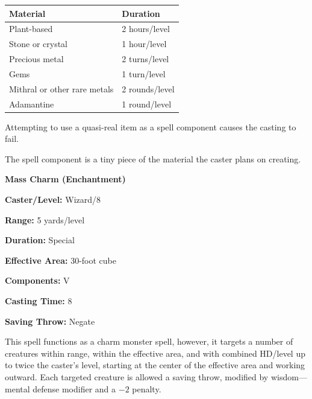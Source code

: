 \begin{multicols}{2}
\noindent
\begin{tabular}{|p{}|p{}|}
\hline
Material	& Duration \\
\hline\hline
\rowcolor[gray]{.9}Plant-based	& 2 hours/level \\
Stone or crystal	& 1 hour/level \\
\rowcolor[gray]{.9}Precious metal	& 2 turns/level \\
Gems	& 1 turn/level \\
\rowcolor[gray]{.9}Mithral or other rare metals	& 2 rounds/level \\
Adamantine	& 1 round/level \\
\hline
\end{tabular}

Attempting to use a quasi-real item as a spell component causes the casting to fail.  

The spell component is a tiny piece of the material the caster plans on creating.

\vspace{1em}

\noindent
\begin{minipage}{\columnwidth}

\noindent \textbf{Mass Charm (Enchantment)}

\noindent \textbf{Caster/Level:} Wizard/8

\noindent \textbf{Range:} 5 yards/level

\noindent \textbf{Duration:} Special

\noindent \textbf{Effective Area:} 30-foot cube

\noindent \textbf{Components:} V

\noindent \textbf{Casting Time:} 8

\noindent \textbf{Saving Throw:} Negate

\end{minipage}

This spell functions as a charm monster spell, however, it targets a number of creatures within range, within the effective area, and with combined HD/level up to twice the caster's level, starting at the center of the effective area and working outward.  Each targeted creature is allowed a saving throw, modified by wisdom---mental defense modifier and a $-2$ penalty.

\vspace{1em}

\noindent
\begin{minipage}{\columnwidth}


\end{minipage}
\end{multicols}
